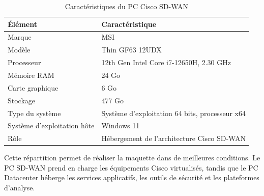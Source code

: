 \documentclass[12pt,a4paper,oneside]{report}
\begin{document}
	\begin{table}[H]
		\centering
		\renewcommand{\arraystretch}{1.2}
		\begin{tabular}{|p{}|p{}|}
			\hline
			\textbf{Élément} & \textbf{Caractéristique} \\
			\hline
			Marque & MSI \\
			\hline
			Modèle & Thin GF63 12UDX \\
			\hline
			Processeur & 12th Gen Intel Core i7-12650H, 2.30 GHz \\
			\hline
			Mémoire RAM & 24 Go \\
			\hline
			Carte graphique & 6 Go \\
			\hline
			Stockage & 477 Go \\
			\hline
			Type du système & Système d'exploitation 64 bits, processeur x64 \\
			\hline
			Système d'exploitation hôte & Windows 11 \\
			\hline
			Rôle & Hébergement de l'architecture Cisco SD-WAN \\
			\hline
		\end{tabular}
		\caption{Caractéristiques du PC Cisco SD-WAN}
		\label{tab:pc-cisco-sdwan}
	\end{table}
	
	\begin{table}[H]
		\centering
		\renewcommand{\arraystretch}{1.2}
		\caption{Répartition des rôles entre les deux machines}
		\label{tab:repartition-machines}
	\end{table}
	
	Cette répartition permet de réaliser la maquette dans de meilleures conditions. Le PC SD-WAN prend en charge les équipements Cisco virtualisés, tandis que le PC Datacenter héberge les services applicatifs, les outils de sécurité et les plateformes d'analyse.
	
\end{document}
